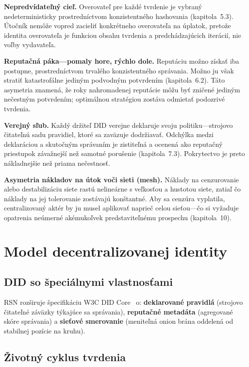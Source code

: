 \documentclass[11pt,a4paper,twocolumn]{article}
\begin{document}
\textbf{Nepredvídateľný cieľ.} Overovateľ pre každé tvrdenie je vybraný nedeterministicky prostredníctvom konzistentného hashovania (kapitola~5.3). Útočník nemôže vopred zacieliť konkrétneho overovateľa na úplatok, pretože identita overovateľa je funkciou obsahu tvrdenia a predchádzajúcich iterácií, nie voľby vydavateľa.

\textbf{Reputačná páka---pomaly hore, rýchlo dole.} Reputáciu možno získať iba postupne, prostredníctvom trvalého konzistentného správania. Možno ju však stratiť katastrofálne jediným podvodným potvrdením (kapitola~6.2). Táto asymetria znamená, že roky nahromadenej reputácie môžu byť zničené jediným nečestným potvrdením; optimálnou stratégiou zostáva odmietať podozrivé tvrdenia.

\textbf{Verejný sľub.} Každý držiteľ DID verejne deklaruje svoju politiku---strojovo čitateľnú sadu pravidiel, ktoré sa zaväzuje dodržiavať. Odchýlka medzi deklaráciou a skutočným správaním je zistiteľná a ocenená ako reputačný priestupok závažnejší než samotné porušenie (kapitola~7.3). Pokrytectvo je preto nákladnejšie než priama nečestnosť.

\textbf{Asymetria nákladov na útok voči sieti (mesh).} Náklady na cenzurovanie alebo destabilizáciu siete rastú nelineárne s veľkosťou a hustotou siete, zatiaľ čo náklady na jej tolerovanie zostávajú konštantné. Aby sa cenzúra vyplatila, centralizovaný aktér by ju musel aplikovať naprieč celou sieťou---čo si vyžaduje opatrenia neúmerné akémukoľvek predstaviteľnému prospechu (kapitola~10).

\section{Model decentralizovanej identity}

\subsection{DID so špeciálnymi vlastnosťami}

RSN rozširuje špecifikáciu W3C DID Core~\cite{did2022} o: \textbf{deklarované pravidlá} (strojovo čitateľné záväzky týkajúce sa správania), \textbf{reputačné metadáta} (agregované skóre správania) a \textbf{sieťové smerovanie} (meniteľná onion brána oddelená od stabilnej pozície na kruhu).

\subsection{Životný cyklus tvrdenia}
\end{document}
